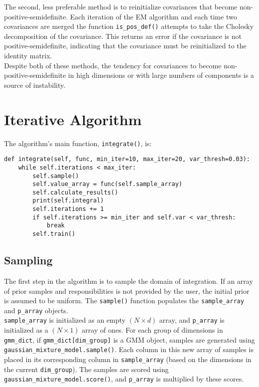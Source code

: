 \documentclass{article}
\begin{document}
The second, less preferable method is to reinitialize covariances that become
non-positive-semidefinite. Each iteration of the EM algorithm and each time two
covariances are merged the function \texttt{is\_pos\_def()} attempts to take the
Cholesky decomposition of the covariance. This returns an error if the covariance
is not positive-semidefinite, indicating that the covariance must be
reinitialized to the identity matrix. \\

Despite both of these methods, the tendency for covariances to become
non-positive-semidefinite in high dimensions or with large numbers of components
is a source of instability.

\section{Iterative Algorithm}

The algorithm's main function, \texttt{integrate()}, is:
\begin{verbatim}
def integrate(self, func, min_iter=10, max_iter=20, var_thresh=0.03):
    while self.iterations < max_iter:
        self.sample()
        self.value_array = func(self.sample_array)
        self.calculate_results()
        print(self.integral)
        self.iterations += 1
        if self.iterations >= min_iter and self.var < var_thresh:
            break
        self.train()
\end{verbatim}

\subsection{Sampling}

The first step in the algorithm is to sample the domain of integration.
If an array of prior samples and responsibilities is not provided by the user,
the initial prior is assumed to be uniform. The \texttt{sample()} function
populates the \texttt{sample\_array} and \texttt{p\_array} objects. \\

\texttt{sample\_array} is initialized as an empty $(N \times d)$ array, and
\texttt{p\_array} is initialized as a $(N \times 1)$ array of ones. For each
group of dimensions in \texttt{gmm\_dict}, if \texttt{gmm\_dict[dim\_group]} is
a GMM object, samples are generated using
\\ \texttt{gaussian\_mixture\_model.sample()}.
Each column in this new array of samples is placed in its corresponding column in
\texttt{sample\_array} (based on the dimensions in the current \texttt{dim\_group}).
The samples are scored using
\\ \texttt{gaussian\_mixture\_model.score()}, and
\texttt{p\_array} is multiplied by these scores. \\
\end{document}
